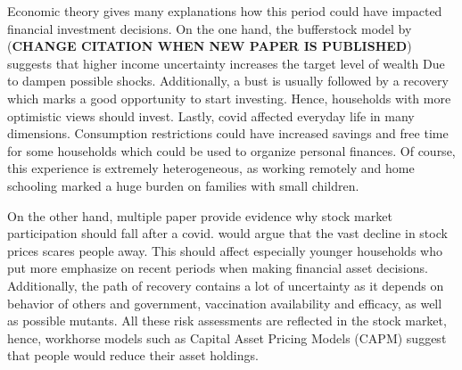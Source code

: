 \documentclass[ProjectABM]{subfiles}
\begin{document}


Economic theory gives many explanations how this period could have impacted financial investment decisions. On the one hand, the bufferstock model by \cite{carroll2009bufferstock} (\textbf{CHANGE CITATION WHEN NEW PAPER IS PUBLISHED}) suggests that higher income uncertainty increases the target level of wealth Due to dampen possible shocks. %
Additionally, a bust is usually followed by a recovery which marks a good opportunity to start investing. Hence, households with more optimistic views should invest. Lastly, covid affected everyday life in many dimensions. Consumption restrictions could have increased savings and free time for some households which could be used to organize personal finances. Of course, this experience is extremely heterogeneous, as working remotely and home schooling marked a huge burden on families with small children.

On the other hand, multiple paper provide evidence why stock market participation should fall after a covid. \cite{malmendier_2011} would argue that the vast decline in stock prices scares people away. This should affect especially younger households who put more emphasize on recent periods when making financial asset decisions. Additionally, the path of recovery contains a lot of uncertainty as it depends on behavior of others and government, vaccination availability and efficacy, as well as possible mutants. All these risk assessments are reflected in the stock market, hence, workhorse models such as Capital Asset Pricing Models (CAPM) suggest that people would reduce their asset holdings.
\end{document}
